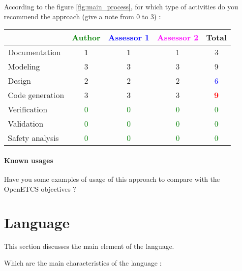 According to the figure \ref{fig:main_process}, for which type of activities do you recommend the approach (give a note from 0 to  3) :

\begin{tabular}{|l | c | c | c | c|}
\hline
& \textcolor{green}{Author} & \textcolor{blue}{Assessor 1} & \textcolor{magenta}{Assessor 2} & Total \\
\hline 
Documentation &1 &1 & 1     & 3     \\
\hline
Modeling &3 &3 & 3    &  9 \\
\hline
Design &2 &2 & 2     & \textcolor{blue}{6} \\
\hline
Code generation &3 &3 & 3    & \textcolor{red}{\textbf{9}} \\
\hline
Verification & \textcolor{green}{0}   & \textcolor{green}{0}   & \textcolor{green}{0} & \textcolor{green}{0} \\
\hline
Validation & \textcolor{green}{0}   & \textcolor{green}{0}   & \textcolor{green}{0} & \textcolor{green}{0} \\
\hline
Safety analysis & \textcolor{green}{0}   & \textcolor{green}{0}   & \textcolor{green}{0} & \textcolor{green}{0} \\
\hline
\end{tabular}

\paragraph{Known usages} Have you some examples of usage of this approach to  compare with the OpenETCS objectives ?

\section{Language}
This section discusses the main element of the language.

Which are the main characteristics of the language :

